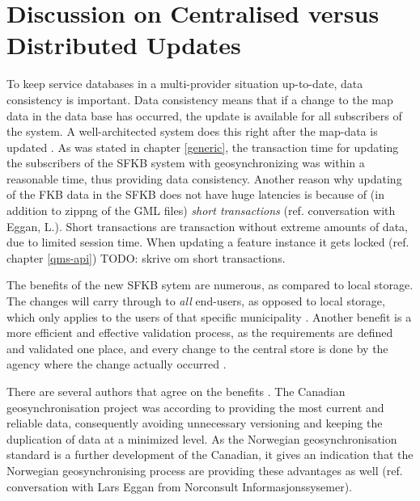 \chapter{Discussion on Centralised versus Distributed Updates }
To keep service databases in a multi-provider situation up-to-date, data consistency 
is important. Data consistency means that if a change to the map data in the data base has occurred, the update is available for all subscribers of the system. A well-architected system does this right after the map-data is updated \citep{Breslow2004}. As was stated in chapter \ref{generic}, the transaction time for updating the subscribers of the SFKB system with geosynchronizing was within a reasonable time, thus providing data consistency. Another reason why updating of the FKB data in the SFKB does not have huge latencies is because of (in addition to zippng of the GML files) \textit{short transactions} (ref. conversation with Eggan, L.). Short transactions are transaction without extreme amounts of data, due to limited session time. When updating a feature instance it gets locked (ref. chapter \ref{qms-api})  TODO: skrive om short transactions.


The benefits of the new SFKB sytem are numerous, as compared to local storage. 
The changes will carry through to \textit{all} end-users, as opposed to local storage, which only applies to the users of that specific municipality \citep{Dontigney2017}. Another benefit is a more efficient and effective validation process, as the requirements are defined and validated one place, and every change to the central store is done by the agency where the change actually occurred \citep{Kartverket2017e}. 

There are several authors that agree on the benefits \citep{Reichardt2012, Zhao2012}. The Canadian geosynchronisation project was according to \cite{Reichardt2012} providing the most current and reliable data, consequently avoiding unnecessary versioning and keeping the duplication of data at a minimized level. As the Norwegian geosynchronisation standard is a further development of the Canadian, it gives an indication that the Norwegian geosynchronising process are providing these advantages as well (ref. conversation with Lars Eggan from Norconsult Informasjonssysemer).



